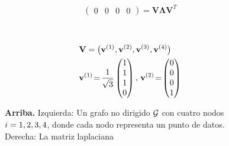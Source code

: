 {{\begin{figure}[H]
\begin{center}
\begin{minipage}{0.4\textwidth}
\begin{equation}
\begin{pmatrix}
							0 & 0 & 0 & 0 
						\end{pmatrix}\!=\!\mathbf{V} {\bm \Lambda} \mathbf{V}^{T}  
						\nonumber
					\end{equation} 
				\end{minipage}
				\vspace*{20mm}\\
				  \begin{minipage}{0.4\textwidth}
				\end{minipage} 
    		\begin{minipage}{0.4\textwidth}
										\begin{align}
											& \mathbf{V} = \big( {\bf v}^{(1)},{\bf v}^{(2)},{\bf v}^{(3)},{\bf v}^{(4)} \big) \nonumber \\
											&	\mathbf{v}^{(1)}\!=\!\frac{1}{\sqrt{3}} \begin{pmatrix} 1 \\ 1 \\ 1 \\ 0 \end{pmatrix}, \,
												\mathbf{v}^{(2)}\!=\!\begin{pmatrix} 0 \\ 0 \\ 0 \\ 1 \end{pmatrix} \nonumber 
												\end{align}
				\end{minipage} 
				\caption{\label{fig_lap_mtx_specclustering_dict} {\bf Arriba.} Izquierda: Un grafo no dirigido
					$\mathcal{G}$ con cuatro nodos $i=1,2,3,4$, donde cada nodo representa un punto de datos. Derecha: La matriz laplaciana
}
\end{center}
\end{figure}}}
